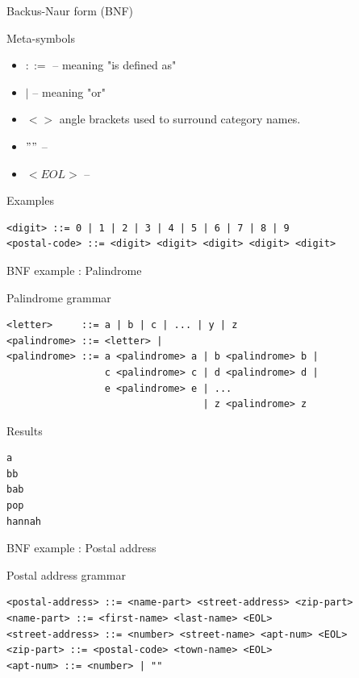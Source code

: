 \documentclass{beamer}
\begin{document}
\begin{frame}[fragile]{Backus-Naur form (BNF)}

\begin{block}{Meta-symbols}
\begin{itemize}
\item $::=$ -- meaning "is defined as"
\item $|$ -- meaning "or"
\item $< >$ angle brackets used to surround category names.
\item $""$ --
\item $<EOL>$ --
\end{itemize}
\end{block}

\begin{exampleblock}{Examples}
\small
\begin{verbatim}
<digit> ::= 0 | 1 | 2 | 3 | 4 | 5 | 6 | 7 | 8 | 9
<postal-code> ::= <digit> <digit> <digit> <digit> <digit>
\end{verbatim}
\end{exampleblock}

\end{frame}

\begin{frame}[fragile]{BNF example : Palindrome}

\begin{exampleblock}{Palindrome grammar}
\begin{verbatim}
<letter>     ::= a | b | c | ... | y | z
<palindrome> ::= <letter> |
<palindrome> ::= a <palindrome> a | b <palindrome> b |
                 c <palindrome> c | d <palindrome> d | 
                 e <palindrome> e | ...
                                  | z <palindrome> z
\end{verbatim}
\end{exampleblock}

\begin{exampleblock}{Results}
\begin{verbatim}
a
bb
bab
pop
hannah
\end{verbatim}
\end{exampleblock}

\end{frame}

\begin{frame}[fragile]{BNF example : Postal address}
\begin{exampleblock}{Postal address grammar}\small
\begin{verbatim}
<postal-address> ::= <name-part> <street-address> <zip-part>
<name-part> ::= <first-name> <last-name> <EOL> 
<street-address> ::= <number> <street-name> <apt-num> <EOL>
<zip-part> ::= <postal-code> <town-name> <EOL>
<apt-num> ::= <number> | ""
\end{verbatim}
\end{exampleblock}
\end{frame}
\end{document}
